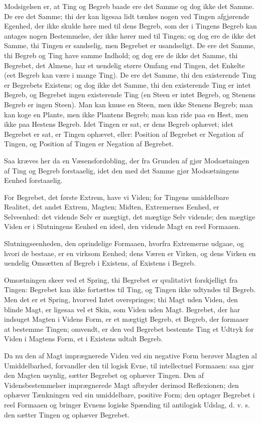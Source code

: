\documentclass[12pt]{book}
\newcommand{\opage}[1]{\marginnote{\footnotesize\textit{[#1]}}}
\begin{document}
Modsigelsen er, at Ting og Begreb baade ere det
Samme og dog ikke det Samme. De ere det Samme;
thi der kan ligesaa lidt tænkes nogen ved Tingen afgjørende
Egenhed, der ikke skulde høre med til dens Begreb, som der
i Tingens Begreb kan antages nogen Bestemmelse, der ikke
hører med til Tingen; og dog ere de ikke det Samme, thi
Tingen er sandselig, men Begrebet er usandseligt. De ere det
Samme, thi Begreb og Ting have samme Indhold; og dog ere
de ikke det Samme, thi Begrebet, det Almene, har et uendelig
større Omfang end Tingen, det Enkelte (eet Begreb kan være
i mange Ting). De ere det Samme, thi den existerende
Ting er Begrebets Existens; og dog ikke det Samme, thi
den existerende Ting er intet Begreb, og Begrebet ingen
existerende Ting (en Steen er intet Begreb, og Stenens
Begreb er ingen Steen). Man kan knuse en Steen, men
ikke Stenens Begreb; man kan koge en Plante, men ikke
Plantens Begreb; man kan ride paa en Hest, men ikke paa
\opage{27} Hestens Begreb. Idet Tingen er sat, er dens Begreb
ophævet; idet Begrebet er sat, er Tingen ophævet, eller:
Position af Begrebet er Negation af Tingen, og Position af
Tingen er Negation af Begrebet.

Saa kræves her da en Væsensfordobling, der fra
Grunden af gjør Modsætningen af Ting og Begreb forstaaelig,
idet den med det Samme gjør Modsætningens Eenhed
forstaaelig.

For Begrebet, det første Extrem, have vi Viden; for
Tingens umiddelbare Realitet, det andet Extrem, Magten;
Midten, Extremernes Eenhed, er Selveenhed: det vidende
Selv er mægtigt, det mægtige Selv vidende; den mægtige
Viden er i Slutningens Eenhed en ideel, den vidende Magt
en reel Formaaen.

Slutningseenheden, den oprindelige Formaaen, hvorfra
Extremerne udgaae, og hvori de bestaae, er en virksom
Eenhed; dens Væren er Virken, og dens Virken en uendelig
Omsætten af Begreb i Existens, af Existens i Begreb.

Omsætningen skeer ved et Spring, thi Begrebet er
qvalitativt forskjelligt fra Tingen: Begrebet kan ikke
fortættes til Ting, og Tingen ikke udtyndes til Begreb. Men
det er et Spring, hvorved Intet overspringes; thi Magt
uden Viden, den blinde Magt, er ligesaa vel et Skin, som
Viden uden Magt. Begrebet, der har indsuget Magten i
Videns Form, er et mægtigt Begreb, et Begreb, der
formaaer at bestemme Tingen; omvendt, er den ved Begrebet
bestemte Ting et Udtryk for Viden i Magtens Form, et i
Existens udtalt Begreb.

Da nu den af Magt imprægnerede Viden ved sin
negative Form berøver Magten al Umiddelbarhed, forvandler
den til logisk Evne, til intellectuel Formaaen: saa gjør den
Magten usynlig, sætter Begrebet og ophæver Tingen. Den
af Vidensbestemmelser imprægnerede Magt afbryder derimod
Reflexionen; den ophæver Tænkningen ved sin umiddelbare,
\opage{28} positive Form; den optager Begrebet i reel Formaaen og
bringer Evnens logiske Spænding til antilogisk Udslag, d.
v. s. den sætter Tingen og ophæver Begrebet.
\end{document}
